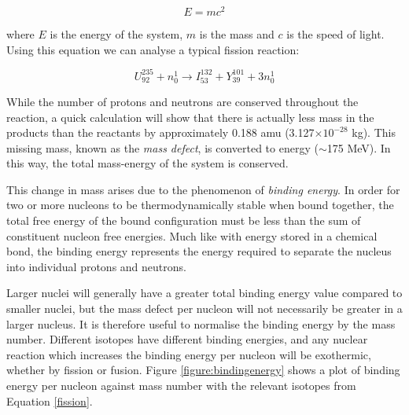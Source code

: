 \begin{equation}
\label{emc2}
    E = mc^{2}
\end{equation}

where $E$ is the energy of the system, $m$ is the mass and $c$ is the speed of light. Using this equation we can analyse a typical fission reaction:

\begin{equation}
\label{fission}
    U^{235}_{92} + n^{1}_{0} \longrightarrow I^{132}_{53} + Y^{101}_{39} + 3n^{1}_{0} 
\end{equation}

While the number of protons and neutrons are conserved throughout the reaction, a quick calculation will show that there is actually less mass in the products than the reactants by approximately 0.188 amu (3.127$\times 10^{-28}$ kg). This missing mass, known as the \emph{mass defect}, is converted to energy ($\sim$175 MeV). In this way, the total mass-energy of the system is conserved. 

This change in mass arises due to the phenomenon of \emph{binding energy}. In order for two or more nucleons to be thermodynamically stable when bound together, the total free energy of the bound configuration must be less than the sum of constituent nucleon free energies. Much like with energy stored in a chemical bond, the binding energy represents the energy required to separate the nucleus into individual protons and neutrons. 

Larger nuclei will generally have a greater total binding energy value compared to smaller nuclei, but the mass defect per nucleon will not necessarily be greater in a larger nucleus. It is therefore useful to normalise the binding energy by the mass number. Different isotopes have different binding energies, and any nuclear reaction which increases the binding energy per nucleon will be exothermic, whether by fission or fusion. Figure \ref{figure:bindingenergy} shows a plot of binding energy per nucleon against mass number with the relevant isotopes from Equation \ref{fission}. 




